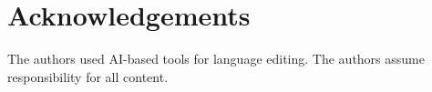 \documentclass{amsart}
\begin{document}
\section*{Acknowledgements}
The authors used AI-based tools for language editing. The authors assume responsibility for all content.


\providecommand{\bysame}{\leavevmode\hbox to3em{\hrulefill}\thinspace}
\providecommand{\MR}{\relax\ifhmode\unskip\space\fi MR }
\providecommand{\MRhref}[2]{%
  \href{http://www.ams.org/mathscinet-getitem?mr=#1}{#2}
}
\providecommand{\href}[2]{#2}
\end{document}

